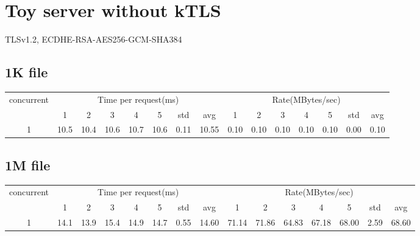 \documentclass{article}
\begin{document}
\section*{Toy server without kTLS}
TLSv1.2, ECDHE-RSA-AES256-GCM-SHA384
\subsection*{1K file}
\begin{table}[H]
    \begin{tabular}{|c|c|c|c|c|c|c|c|c|c|c|c|c|c|c|}
        \hline
        \multirow{2}{*}{concurrent} & \multicolumn{7}{c|}{Time per request(ms)} & \multicolumn{7}{c|}{Rate(MBytes/sec)}                                                                                      \\ \cline{2-15}
                                    & 1                                         & 2                                     & 3    & 4    & 5    & std  & avg   & 1    & 2    & 3    & 4    & 5    & std  & avg  \\ \hline
        1                           & 10.5                                      & 10.4                                  & 10.6 & 10.7 & 10.6 & 0.11 & 10.55 & 0.10 & 0.10 & 0.10 & 0.10 & 0.10 & 0.00 & 0.10 \\ \hline
    \end{tabular}
\end{table}
\subsection*{1M file}
\begin{table}[H]
    \begin{tabular}{|c|c|c|c|c|c|c|c|c|c|c|c|c|c|c|}
        \hline
        \multirow{2}{*}{concurrent} & \multicolumn{7}{c|}{Time per request(ms)} & \multicolumn{7}{c|}{Rate(MBytes/sec)}                                                                                            \\ \cline{2-15}
                                    & 1                                         & 2                                     & 3    & 4    & 5    & std  & avg   & 1     & 2     & 3     & 4     & 5     & std  & avg   \\ \hline
        1                           & 14.1                                      & 13.9                                  & 15.4 & 14.9 & 14.7 & 0.55 & 14.60 & 71.14 & 71.86 & 64.83 & 67.18 & 68.00 & 2.59 & 68.60 \\ \hline
    \end{tabular}
\end{table}
\end{document}
